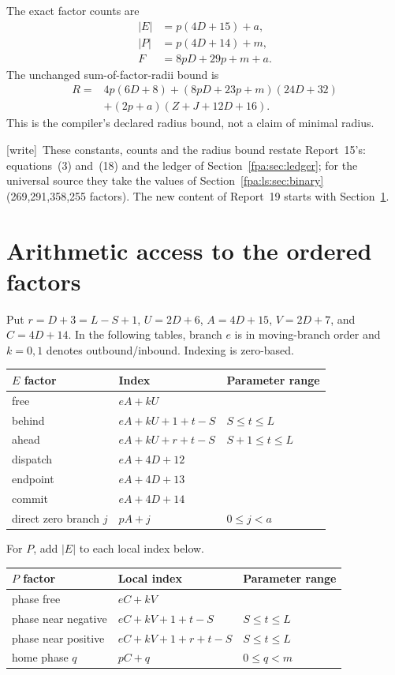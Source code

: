 \documentclass[11pt,a4paper]{article}
\numberwithin{equation}{section}
\newcommand{\wtag}{\textup{[write]}}
\begin{document}
The exact factor counts are
\begin{align*}
|E|&=p(4D+15)+a,\\
|P|&=p(4D+14)+m,\\
F&=8pD+29p+m+a.
\end{align*}
The unchanged sum-of-factor-radii bound is
\begin{align*}
R={}&4p(6D+8)+(8pD+23p+m)(24D+32)\\
&+(2p+a)(Z+J+12D+16).
\end{align*}
This is the compiler's declared radius bound, not a claim of minimal radius.

\wtag\ These constants, counts and the radius bound restate Report~15's: equations~(3) and~(18) and the ledger of Section~\ref{fpa:sec:ledger}; for the universal source they take the values of Section~\ref{fpa:ls:sec:binary} (269,291,358,255 factors). The new content of Report~19 starts with Section~\ref{fpa:lz:sec:index}.

\section{Arithmetic access to the ordered factors}\label{fpa:lz:sec:index}
Put $r=D+3=L-S+1$, $U=2D+6$, $A=4D+15$, $V=2D+7$, and $C=4D+14$. In the following tables, branch $e$ is in moving-branch order and $k=0,1$ denotes outbound/inbound. Indexing is zero-based.

\begin{center}
\begin{tabular}{@{}lll@{}}
\toprule
$E$ factor & Index & Parameter range\\
\midrule
free & $eA+kU$ & \\
behind & $eA+kU+1+t-S$ & $S\leq t\leq L$\\
ahead & $eA+kU+r+t-S$ & $S+1\leq t\leq L$\\
dispatch & $eA+4D+12$ & \\
endpoint & $eA+4D+13$ & \\
commit & $eA+4D+14$ & \\
direct zero branch $j$ & $pA+j$ & $0\leq j<a$\\
\bottomrule
\end{tabular}
\end{center}

For $P$, add $|E|$ to each local index below.
\begin{center}
\begin{tabular}{@{}lll@{}}
\toprule
$P$ factor & Local index & Parameter range\\
\midrule
phase free & $eC+kV$ & \\
phase near negative & $eC+kV+1+t-S$ & $S\leq t\leq L$\\
phase near positive & $eC+kV+1+r+t-S$ & $S\leq t\leq L$\\
home phase $q$ & $pC+q$ & $0\leq q<m$\\
\bottomrule
\end{tabular}
\end{center}
\end{document}
